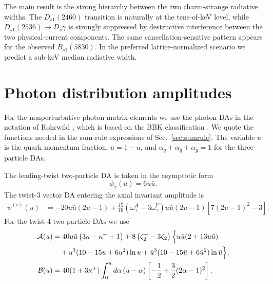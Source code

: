 \documentclass[aps,prd,preprint,nofootinbib,superscriptaddress]{revtex4-2}
\newcommand{\Ds}{D_s}
\newcommand{\Dsone}{D_{s1}}
\newcommand{\Bsone}{B_{s1}}
\begin{document}
The main result is the strong hierarchy between the two charm-strange
radiative widths.  The $\Dsone(2460)$ transition is naturally at the
tens-of-keV level, while $\Dsone(2536)\to\Ds\gamma$ is strongly suppressed by
destructive interference between the two physical-current components.  The
same cancellation-sensitive pattern appears for the observed $\Bsone(5830)$.
In the preferred lattice-normalized scenario we predict a sub-keV median
radiative width.

\appendix

\section{Photon distribution amplitudes}
\label{app:photon-das}

For the nonperturbative photon matrix elements we use the photon DAs in the
notation of Rohrwild \cite{Rohrwild:2007yt}, which is based on the BBK
classification \cite{Ball:2002ps}.  We quote the functions needed in the
sum-rule expressions of Sec.~\ref{sec:sumrule}.  The variable $u$ is the
quark momentum fraction, $\bar u=1-u$, and
$\alpha_q+\alpha_{\bar q}+\alpha_g=1$ for the three-particle DAs.

The leading-twist two-particle DA is taken in the asymptotic form
\begin{equation}
  \phi_\gamma(u)=6u\bar u .
  \label{eq:app-phi}
\end{equation}
The twist-3 vector DA entering the axial invariant amplitude is
\begin{align}
  \psi^{(v)}(u)
  &=
  -20u\bar u(2u-1)
  +\frac{15}{16}\left(\omega_\gamma^A-3\omega_\gamma^V\right)
  u\bar u(2u-1)\left[7(2u-1)^2-3\right].
  \label{eq:app-psiv}
\end{align}
For the twist-4 two-particle DAs we use
\begin{align}
  {\cal A}(u)
  &=
  40u\bar u\left(3\kappa-\kappa^+ +1\right)
  +8\left(\zeta_2^+-3\zeta_2\right)
  \Big\{
  u\bar u(2+13u\bar u)
  \notag\\
  &\quad
  +u^3(10-15u+6u^2)\ln u
  +\bar u^3(10-15\bar u+6\bar u^2)\ln\bar u
  \Big\},
  \label{eq:app-A}\\
  {\cal B}(u)
  &=
  40(1+3\kappa^+)
  \int_0^u d\alpha\,(u-\alpha)
  \left[-\frac12+\frac32(2\alpha-1)^2\right].
  \label{eq:app-B}
\end{align}
\end{document}
